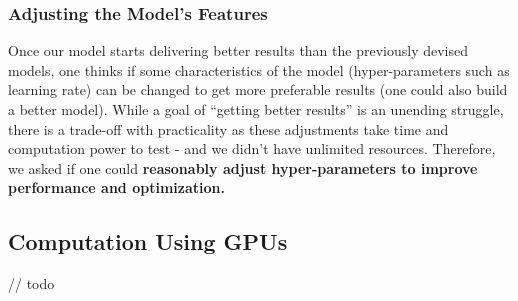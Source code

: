 \subsubsection{Adjusting the Model's Features} \label{sec:Important Questions - Adjusting the Model's Features}
Once our model starts delivering better results than the previously devised models, one thinks if some characteristics of the model (hyper-parameters such as learning rate) can be changed to get more preferable results (one could also build a better model). While a goal of ``getting better results'' is an unending struggle, there is a trade-off with practicality as these adjustments take time and computation power to test - and we didn't have unlimited resources. Therefore, we asked if one could \textbf{reasonably adjust hyper-parameters to improve performance and optimization.}

\subsection{Computation Using GPUs} \label{sec:Computation Using GPUs}
// todo